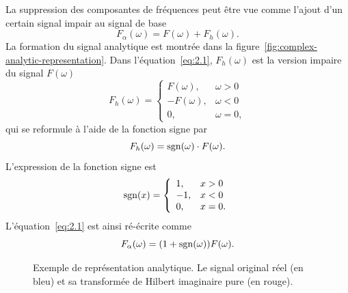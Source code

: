 La suppression des composantes de fréquences peut être vue comme l'ajout d'un certain signal impair au signal de base
\begin{equation} \label{eq:2.1}
    F_{\alpha}(\omega) = F(\omega) + F_h(\omega).
\end{equation}
La formation du signal analytique est montrée dans la figure~\ref{fig:complex-analytic-representation}. Dans l'équation~\ref{eq:2.1}, $F_h(\omega)$ est la version impaire du signal $F(\omega)$
\begin{equation}
    F_h(\omega) = \left\{
    \begin{array}{ll}
        F(\omega), & \omega > 0 \\
        -F(\omega), & \omega < 0 \\
        0, & \omega = 0,
    \end{array}
    \right.
\end{equation}
qui se reformule à l'aide de la fonction signe par
\begin{equation}
    F_h(\omega) = \operatorname{sgn}(\omega)\cdot F(\omega).
    \label{eq:2.5}
\end{equation}
L'expression de la fonction signe est
\begin{equation}
    \operatorname{sgn}(x) = \left\{
    \begin{array}{ll}
        1, & x > 0 \\
        -1, & x < 0 \\
        0, & x = 0.
    \end{array}
    \right.
\end{equation}
L'équation~\ref{eq:2.1} est ainsi ré-écrite comme
\begin{equation}
    F_{\alpha}(\omega) = (1+\operatorname{sgn}(\omega))F(\omega).
\end{equation}

\bigskip

\begin{figure}[h]
    \centering

    \caption[Signal analytique pour un signal complexe]{Exemple de représentation analytique. Le signal original réel (en bleu) et sa transformée de Hilbert imaginaire pure (en rouge).}
    \label{fig:analytic-representation}
\end{figure}

